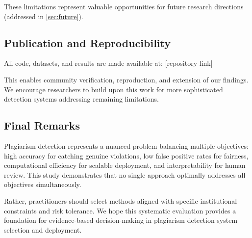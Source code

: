 These limitations represent valuable opportunities for future research directions (addressed in \ref{sec:future}).

\subsection{Publication and Reproducibility}

All code, datasets, and results are made available at: [repository link]

This enables community verification, reproduction, and extension of our findings. We encourage researchers to build upon this work for more sophisticated detection systems addressing remaining limitations.

\subsection{Final Remarks}

Plagiarism detection represents a nuanced problem balancing multiple objectives: high accuracy for catching genuine violations, low false positive rates for fairness, computational efficiency for scalable deployment, and interpretability for human review. This study demonstrates that no single approach optimally addresses all objectives simultaneously.

Rather, practitioners should select methods aligned with specific institutional constraints and risk tolerance. We hope this systematic evaluation provides a foundation for evidence-based decision-making in plagiarism detection system selection and deployment.
